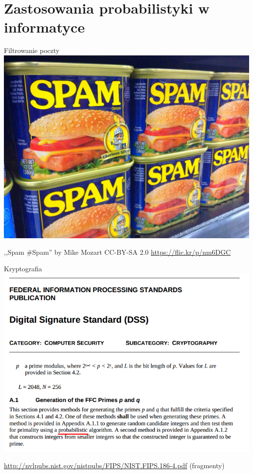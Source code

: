 \documentclass{beamer}
\begin{document}
\part{Zastosowania probabilistyki w informatyce}
\frame{\partpage}
\begin{frame}{Filtrowanie poczty}
\centering\includegraphics[width=.85\textwidth]{spam.jpg}

{\tiny ,,Spam \#Spam'' by Mike Mozart CC-BY-SA 2.0 \url{https://flic.kr/p/nm6DGC}}
\end{frame}
\begin{frame}{Kryptografia}
\centering\includegraphics[width=.9\textwidth]{dsa.png}

{\tiny \url{http://nvlpubs.nist.gov/nistpubs/FIPS/NIST.FIPS.186-4.pdf} (fragmenty)}
\end{frame}
\end{document}
